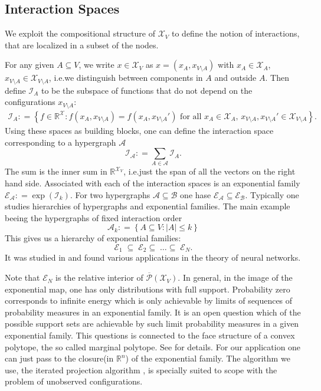 \documentclass[12pt]{amsart}
\newcommand{\set}[1]{\left\lbrace #1 \right\rbrace} %
\newcommand{\defas}{\mathrel{\mathop{:}}=}   %
\renewcommand{\subset}{\subseteq}  %
\providecommand{\abs}[1]{\left\lvert#1\right\rvert}
\newcommand{\ie}{i.e.\;}  %
\theoremstyle{plain}%
\theoremstyle{definition}
\theoremstyle{remark}
\begin{document}
\subsection{Interaction Spaces}
We exploit the compositional structure of $\mathcal{X}_V$ to 
define the notion of interactions, that are localized in a subset of the nodes. 

For any given $A\subset V$, we
write $x\in \mathcal{X}_V$ as $x = (x_A,x_{V\setminus
  A})$ with $x_A\in \mathcal{X}_A$, $x_{V \setminus
  A}\in\mathcal{X}_{V \setminus A}$, \ie we distinguish between components in
  $A$ and outside $A$. Then define ${\mathcal I}_A$ to be the
subspace of functions that do not depend on the configurations
$x_{V \setminus A}$:
\begin{align*}
  {\mathcal I}_A \defas \left\{ f \in {\mathbb R}^\mathcal{X} : 
    f(x_A,x_{V \setminus A}) = f(x_A, x_{V
      \setminus A}') \mbox{ for all $x_A \in \mathcal{X}_A$, $x_{V \setminus A}, 
      x_{V \setminus A}' \in \mathcal{X}_{V
        \setminus A}$} \right\}.
\end{align*}
Using these spaces as building blocks, one can define the interaction
space corresponding to a hypergraph $\mathcal{A}$ 
\[
{\mathcal I}_\mathcal{A} \defas \sum_{ A \in \mathcal{A} } {\mathcal I}_A.
\]
The sum is the inner sum in $\mathbb{R}^{\mathcal{X}_V}$, \ie just the span of all
the vectors on the right hand side.
Associated with each of the interaction spaces is an exponential family
$\mathcal{E}_{\mathcal{A}}
\defas \exp(\mathcal{I}_k)$. For two hypergraphs $\mathcal{A} \subset
\mathcal{B}$ one hase $\mathcal{E}_{\mathcal{A}}\subset
\mathcal{E}_{\mathcal{B}}$. Typically one studies hierarchies of hypergraphs and
exponential families\cite{KahOlbJosAy08}. The main example beeing the
hypergraphs of fixed interaction order 
\begin{equation*}
  \mathcal{A}_k \defas \set{A\subset V : \abs{A} \leq k}  
\end{equation*}
This gives us a hierarchy of exponential families: 
\[ {\mathcal E}_{1} \; \subseteq \;
{\mathcal E}_{2} \subseteq \; \dots \subseteq \; {\mathcal E}_{N}.
\] 
It was studied in \cite{Amari01,ayknauf06} and found various
applications in the theory of neural networks. 

Note that $\mathcal{E}_N$ is the relative interior of
$\overline{\mathcal{P}}(\mathcal{X}_V)$. In general, in the image of the
exponential map, one has only distributions with full support. Probability
zero corresponds to infinite energy which is only achievable by 
limits of sequences of probability measures in an exponential family. It is an
open question which of the possible support sets are achievable by such limit
probability measures in a given exponential family. This questions is connected to
the face structure of a convex polytope, the so called marginal polytope. See
\cite{CziMa02,kahleay06} for details.
For our application one can just pass to the closure(in $\mathbb{R}^n$) 
of the exponential family. The algorithm we use, the iterated projection
algorithm \cite{csiszarshields04}, is specially suited to scope
with the problem of unobserved configurations. 
\end{document}
